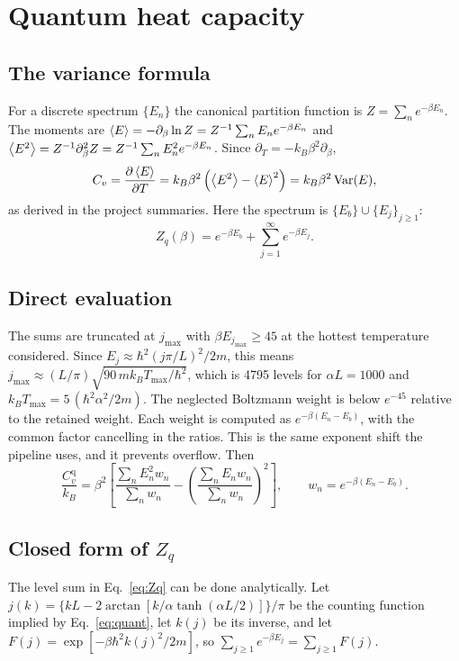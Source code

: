 \documentclass[11pt]{article}
\numberwithin{equation}{section}
\newcommand{\Cq}{C_v^{\mathrm{q}}}
\newcommand{\kB}{k_{B}}
\begin{document}
\section{Quantum heat capacity}
\label{sec:quantum}

\subsection{The variance formula}
For a discrete spectrum $\{E_n\}$ the canonical partition function is $Z=\sum_ne^{-\beta E_n}$. The moments are $\expval{E}=-\partial_\beta\ln Z=Z^{-1}\sum_nE_ne^{-\beta E_n}$ and $\expval{E^2}=Z^{-1}\partial_\beta^2Z=Z^{-1}\sum_nE_n^2e^{-\beta E_n}$. Since $\partial_T=-\kB\beta^2\partial_\beta$,
\begin{equation}
C_v=\pdv{\expval{E}}{T}=\kB\beta^2\left(\expval{E^2}-\expval{E}^2\right)=\kB\beta^2\,\mathrm{Var}(E),
\label{eq:var}
\end{equation}
as derived in the project summaries. Here the spectrum is $\{E_b\}\cup\{E_j\}_{j\ge1}$:
\begin{equation}
Z_q(\beta)=e^{-\beta E_b}+\sum_{j=1}^{\infty}e^{-\beta E_j}.
\label{eq:Zq}
\end{equation}

\subsection{Direct evaluation}
The sums are truncated at $j_{\max}$ with $\beta E_{j_{\max}}\ge45$ at the hottest temperature considered. Since $E_j\approx\hbar^2(j\pi/L)^2/2m$, this means $j_{\max}\approx(L/\pi)\sqrt{90\,m\kB T_{\max}/\hbar^2}$, which is 4795 levels for $\alpha L=1000$ and $\kB T_{\max}=5\,(\hbar^2\alpha^2/2m)$. The neglected Boltzmann weight is below $e^{-45}$ relative to the retained weight. Each weight is computed as $e^{-\beta(E_n-E_b)}$, with the common factor cancelling in the ratios. This is the same exponent shift the pipeline uses, and it prevents overflow. Then
\begin{equation}
\frac{\Cq}{\kB}=\beta^2\left[\frac{\sum_nE_n^2w_n}{\sum_nw_n}-\left(\frac{\sum_nE_nw_n}{\sum_nw_n}\right)^2\right],\qquad w_n=e^{-\beta(E_n-E_b)}.
\label{eq:Cqsum}
\end{equation}

\subsection{Closed form of \texorpdfstring{$Z_q$}{Zq}}
\label{sec:Zclosed}
The level sum in Eq.~\eqref{eq:Zq} can be done analytically. Let $j(k)=\{kL-2\arctan[k/\alpha\tanh(\alpha L/2)]\}/\pi$ be the counting function implied by Eq.~\eqref{eq:quant}, let $k(j)$ be its inverse, and let $F(j)=\exp[-\beta\hbar^2k(j)^2/2m]$, so $\sum_{j\ge1}e^{-\beta E_j}=\sum_{j\ge1}F(j)$.
\end{document}
